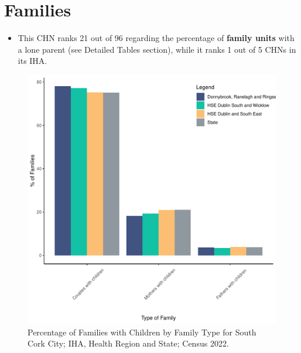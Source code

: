 \documentclass{article}
\begin{document}
\section{Families}\label{sect:Fam}
\begin{itemize}
\item This CHN ranks  21 out of 96 regarding the percentage of \textbf{family units} with a lone parent (see Detailed Tables section), while it ranks   1 out of 5 CHNs in its IHA.
\end{itemize}
\begin{figure}[H]
	\centering
	\includegraphics[width = 150mm]{../figures/FamED.pdf}
	\caption{Percentage of Families with Children by Family Type for South Cork City; IHA, Health Region and State; Census 2022.}
	\label{fig:vbnv}
	\end{figure}
	
\end{document}
